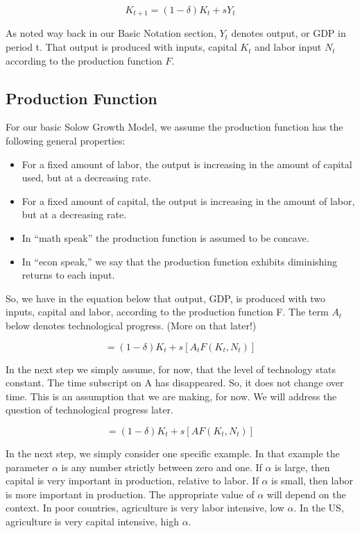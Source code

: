 \documentclass[
]{book}
\providecommand{\tightlist}{%
  \setlength{\itemsep}{0pt}\setlength{\parskip}{0pt}}
\begin{document}
\[K_{t+1}=(1-\delta) K_t+sY_t\]

As noted way back in our Basic Notation section, \(Y_t\) denotes output, or GDP in period t. That output is produced with inputs, capital \(K_t\) and labor input \(N_t\) according to the production function \(F\).

\hypertarget{production-function}{%
\subsection{Production Function}\label{production-function}}

For our basic Solow Growth Model, we assume the production function has the following general properties:

\begin{itemize}
\tightlist
\item
  For a fixed amount of labor, the output is increasing in the amount of capital used, but at a decreasing rate.
\item
  For a fixed amount of capital, the output is increasing in the amount of labor, but at a decreasing rate.
\item
  In ``math speak'' the production function is assumed to be concave.
\item
  In ``econ speak,'' we say that the production function exhibits diminishing returns to each input.
\end{itemize}

So, we have in the equation below that output, GDP, is produced with two inputs, capital and labor, according to the production function F. The term \(A_t\) below denotes technological progress. (More on that later!)

\[=(1-δ) K_t+s[A_t F (K_t,N_t)]\]

In the next step we simply assume, for now, that the level of technology stats constant. The time subscript on A has disappeared. So, it does not change over time. This is an assumption that we are making, for now. We will address the question of technological progress later.

\[=(1-δ) K_t+s[A F (K_t,N_t)]\]

In the next step, we simply consider one specific example. In that example the parameter \(\alpha\) is any number strictly between zero and one. If \(\alpha\) is large, then capital is very important in production, relative to labor. If \(\alpha\) is small, then labor is more important in production. The appropriate value of \(\alpha\) will depend on the context. In poor countries, agriculture is very labor intensive, low \(\alpha\). In the US, agriculture is very capital intensive, high \(\alpha\).
\end{document}

